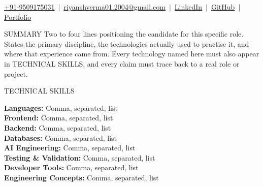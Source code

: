 \documentclass{resume} %
\begin{document}

\vspace{-22pt}

\begin{center}
    {\normalsize
    \href{tel:+919509175031}{+91-9509175031}
    \,${\vert}$\,
    \href{mailto:riyanshverma01.2004@gmail.com}{riyanshverma01.2004@gmail.com}
    \,${\vert}$\,
    \href{https://www.linkedin.com/in/riyansh-verma}{LinkedIn}
    \,${\vert}$\,
    \href{https://github.com/Riyanshverma}{GitHub}
    \,${\vert}$\,
    \href{https://riyansh-portfolio-five.vercel.app/}{Portfolio}
    }
    \\[2pt]
\end{center}

\vspace{-2pt}


\begin{rSection}{SUMMARY}
Two to four lines positioning the candidate for this specific role. States the
primary discipline, the technologies actually used to practise it, and where
that experience came from. Every technology named here must also appear in
TECHNICAL SKILLS, and every claim must trace back to a real role or project.

\end{rSection}

\vspace{-2pt}


\begin{rSection}{TECHNICAL SKILLS}

\setlength{\parskip}{6pt}
\setlength{\parindent}{2pt}

\textbf{Languages:} Comma, separated, list \\[2pt]
\textbf{Frontend:} Comma, separated, list \\[2pt]
\textbf{Backend:} Comma, separated, list \\[2pt]
\textbf{Databases:} Comma, separated, list \\[2pt]
\textbf{AI Engineering:} Comma, separated, list \\[2pt]
\textbf{Testing \& Validation:} Comma, separated, list \\[2pt]
\textbf{Developer Tools:} Comma, separated, list \\[2pt]
\textbf{Engineering Concepts:} Comma, separated, list

\end{rSection}
\end{document}
